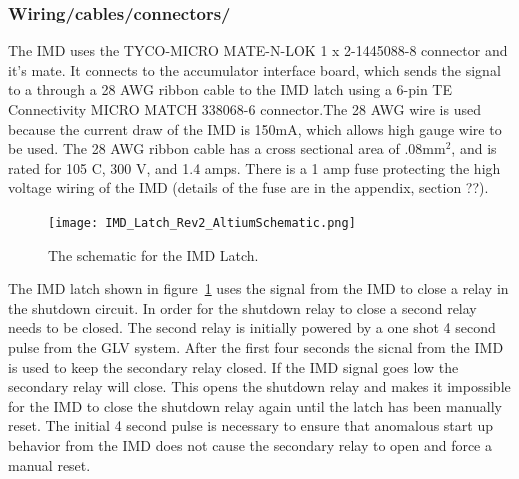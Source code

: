 \documentclass{article}
\begin{document}
\subsubsection{Wiring/cables/connectors/}

The  IMD uses the TYCO-MICRO MATE-N-LOK 1 x 2-1445088-8 connector and it's mate. It connects to the accumulator interface board, which sends the signal to a through a 28 AWG ribbon cable to the IMD latch using a 6-pin TE Connectivity MICRO MATCH 338068-6 connector.The 28 AWG wire is used because the current draw of the IMD is 150mA, which allows high gauge wire to be used. The 28 AWG ribbon cable has a cross sectional area of .08mm$^2$, and is rated for 105 \textdegree C, 300 V, and 1.4 amps. There is a 1 amp fuse protecting the high voltage wiring of the IMD (details of the fuse are in the appendix, section ??). %




\begin{figure} [!ht]
	\centering  %
	
	\texttt{[image: IMD\_Latch\_Rev2\_AltiumSchematic.png]}
	
	\caption{The schematic for the IMD Latch.}
	
	\label{fig:IMDLatch_Schematic}
\end{figure}

The IMD latch shown in figure~\ref{fig:IMDLatch_Schematic} uses the signal from the IMD to close a relay in the shutdown circuit. In order for the shutdown relay to close a second relay needs to be closed. The second relay is initially powered by a one shot 4 second pulse from the GLV system. After the first four seconds the sicnal from the IMD is used to keep the secondary relay closed. If the IMD signal goes low the secondary relay will close. This opens the shutdown relay and makes it impossible for the IMD to close the shutdown relay again until the latch has been manually reset. The initial 4 second pulse is necessary to ensure that anomalous start up behavior from the IMD does not cause the secondary relay to open and force a manual reset.
\end{document}
